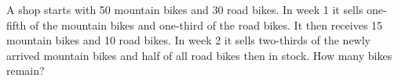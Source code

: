 A shop starts with 50 mountain bikes and 30 road bikes. In week 1 it sells one-fifth of the mountain bikes and one-third of the road bikes. It then receives 15 mountain bikes and 10 road bikes. In week 2 it sells two-thirds of the newly arrived mountain bikes and half of all road bikes then in stock. How many bikes remain?
